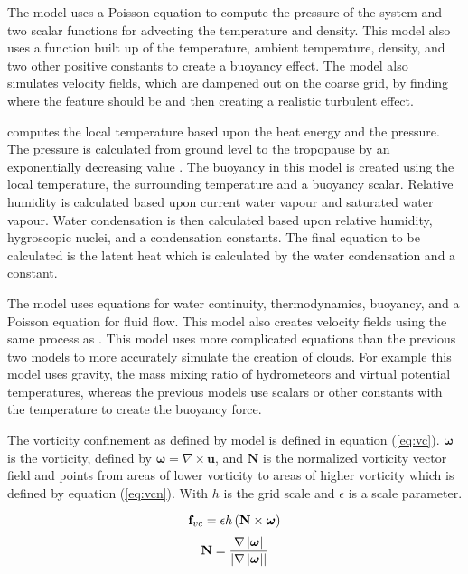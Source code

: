 The \citet*{Fedkiw01} model uses a Poisson equation to compute the pressure of the system and two scalar functions for advecting the temperature and density.
This model also uses a function built up of the temperature, ambient temperature, density, and two other positive constants to create a buoyancy effect.
The model also simulates velocity fields, which are dampened out on the coarse grid, by finding where the feature should be and then creating a realistic turbulent effect.

\citet*{DOverby02} computes the local temperature based upon the heat energy and the pressure.
The pressure is calculated from ground level to the tropopause by an exponentially decreasing value \citep*{DOverby02}.
The buoyancy in this model is created using the local temperature, the surrounding temperature and a buoyancy scalar.
Relative humidity is calculated based upon current water vapour and saturated water vapour.
Water condensation is then calculated based upon relative humidity, hygroscopic nuclei, and a condensation constants.
The final equation to be calculated is the latent heat which is calculated by the water condensation and a constant.
 
The \citet{HarrisEtAl03} model uses equations for water continuity, thermodynamics, buoyancy, and a Poisson equation for fluid flow.
This model also creates velocity fields using the same process as \citet*{Fedkiw01}.
This model uses more complicated equations than the previous two models to more accurately simulate the creation of clouds.
For example this model uses gravity, the mass mixing ratio of hydrometeors and virtual potential temperatures, whereas the previous models use scalars or other constants with the temperature to create the buoyancy force.

The vorticity confinement as defined by \citet{HarrisEtAl03} model is defined in equation (\ref{eq:vc}).
$\boldsymbol{\omega}$ is the vorticity, defined by $\boldsymbol{\omega} = \nabla\times\mathbf{u}$, and $\mathbf{N}$ is the normalized vorticity vector field and points from areas of lower vorticity to areas of higher vorticity which is defined by equation (\ref{eq:vcn}).
With $h$ is the grid scale and $\epsilon$ is a scale parameter.

\begin{equation} \label{eq:vc}
  \centering
  \mathbf{f}_{vc} = \epsilon h\left(\mathbf{N}\times\boldsymbol{\omega}\right)
\end{equation}
\begin{equation} \label{eq:vcn}
  \centering
  \mathbf{N} = \frac{\nabla\left|\boldsymbol{\omega}\right|}{\left|\nabla\left|\boldsymbol{\omega}\right|\right|}
\end{equation}

